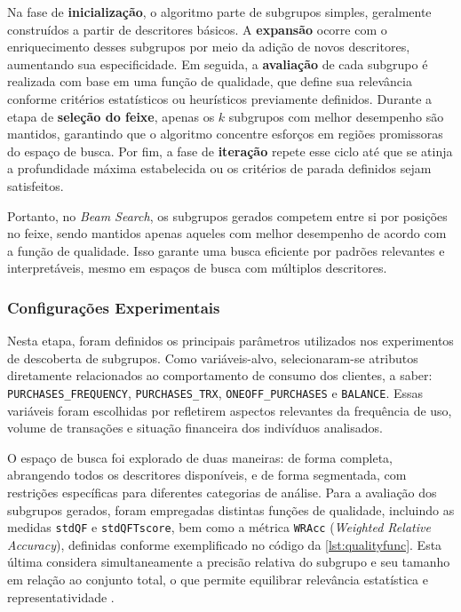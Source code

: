 \documentclass[12pt]{article}
\begin{document}
Na fase de \textbf{inicialização}, o algoritmo parte de subgrupos simples, geralmente construídos a partir de descritores básicos. A \textbf{expansão} ocorre com o enriquecimento desses subgrupos por meio da adição de novos descritores, aumentando sua especificidade. Em seguida, a \textbf{avaliação} de cada subgrupo é realizada com base em uma função de qualidade, que define sua relevância conforme critérios estatísticos ou heurísticos previamente definidos. Durante a etapa de \textbf{seleção do feixe}, apenas os $k$ subgrupos com melhor desempenho são mantidos, garantindo que o algoritmo concentre esforços em regiões promissoras do espaço de busca. Por fim, a fase de \textbf{iteração} repete esse ciclo até que se atinja a profundidade máxima estabelecida ou os critérios de parada definidos sejam satisfeitos.

Portanto, no \textit{Beam Search}, os subgrupos gerados competem entre si por posições no feixe, sendo mantidos apenas aqueles com melhor desempenho de acordo com a função de qualidade. Isso garante uma busca eficiente por padrões relevantes e interpretáveis, mesmo em espaços de busca com múltiplos descritores.

\subsubsection{Configurações Experimentais}

\hspace{1.2cm}Nesta etapa, foram definidos os principais parâmetros utilizados nos experimentos de descoberta de subgrupos. Como variáveis-alvo, selecionaram-se atributos diretamente relacionados ao comportamento de consumo dos clientes, a saber: \texttt{PURCHASES\_FREQUENCY}, \texttt{PURCHASES\_TRX}, \texttt{ONEOFF\_PURCHASES} e \texttt{BALANCE}. Essas variáveis foram escolhidas por refletirem aspectos relevantes da frequência de uso, volume de transações e situação financeira dos indivíduos analisados.

O espaço de busca foi explorado de duas maneiras: de forma completa, abrangendo todos os descritores disponíveis, e de forma segmentada, com restrições específicas para diferentes categorias de análise. Para a avaliação dos subgrupos gerados, foram empregadas distintas funções de qualidade, incluindo as medidas \texttt{stdQF} e \texttt{stdQFTscore}, bem como a métrica \texttt{WRAcc} (\textit{Weighted Relative Accuracy}), definidas conforme exemplificado no código da \autoref{lst:qualityfunc}. Esta última considera simultaneamente a precisão relativa do subgrupo e seu tamanho em relação ao conjunto total, o que permite equilibrar relevância estatística e representatividade \cite{vimieiro:24}.
\end{document}

